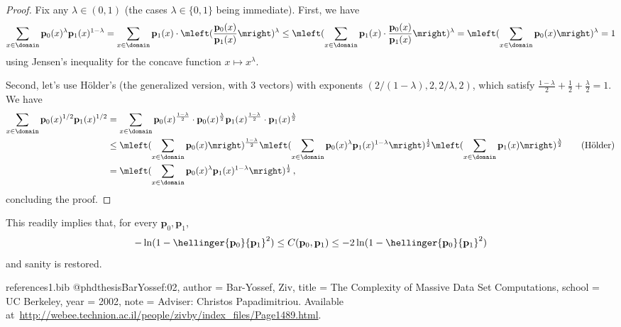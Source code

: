 \documentclass[10pt]{article}
\newcommand{\p}{\mathbf{p}}
\begin{document}
\begin{proof}
Fix any $\lambda \in(0,1)$ (the cases $\lambda\in\{0,1\}$ being immediate). First, we have
\[
\sum_{x\in\domain} \p_0(x)^\lambda\p_1(x)^{1-\lambda}
 = \sum_{x\in\domain} \p_1(x)\cdot \mleft(\frac{\p_0(x)}{\p_1(x)}\mright)^\lambda
 \leq \mleft(\sum_{x\in\domain} \p_1(x)\cdot \frac{\p_0(x)}{\p_1(x)}\mright)^\lambda
 = \mleft(\sum_{x\in\domain} \p_0(x)\mright)^\lambda = 1
\] 
using Jensen's inequality for the concave function $x\mapsto x^\lambda$. 

Second, let's use H\"older's (the generalized version, with 3 vectors) with exponents $(2/(1-\lambda), 2, 2/\lambda, 2)$, which satisfy $\frac{1-\lambda}{2}+\frac{1}{2}+\frac{\lambda}{2}=1$. We have
\begin{align*}
\sum_{x\in\domain} \p_0(x)^{1/2}\p_1(x)^{1/2}
 &= \sum_{x\in\domain} \p_0(x)^{\frac{1-\lambda}{2}}\cdot \p_0(x)^{\frac{\lambda}{2}}\p_1(x)^{\frac{1-\lambda}{2}}\cdot \p_1(x)^{\frac{\lambda}{2}}\\
 &\leq \mleft(\sum_{x\in\domain} \p_0(x)\mright)^{\frac{1-\lambda}{2}}\mleft(\sum_{x\in\domain} \p_0(x)^{\lambda}\p_1(x)^{1-\lambda} \mright)^{\frac{1}{2}}\mleft(\sum_{x\in\domain} \p_1(x)\mright)^{\frac{\lambda}{2}} \tag{H\"older}\\
 &= \mleft(\sum_{x\in\domain} \p_0(x)^{\lambda}\p_1(x)^{1-\lambda} \mright)^{\frac{1}{2}}\,,
\end{align*}
concluding the proof.
\end{proof}
This readily implies that, for every $\p_0,\p_1$,
\begin{equation}
-\ln(1-\hellinger{\p_0}{\p_1}^2) \leq C(\p_0,\p_1) \leq -2\ln(1-\hellinger{\p_0}{\p_1}^2)
\end{equation}
and sanity is restored.


\begin{filecontents}{references1.bib}
@phdthesis{BarYossef:02,
  author = {Bar-Yossef, Ziv},
  title = {The Complexity of Massive Data Set Computations},
  school = {UC Berkeley},
  year = {2002},
  note = {Adviser: Christos Papadimitriou. Available at~\url{http://webee.technion.ac.il/people/zivby/index_files/Page1489.html}.}
}
\end{filecontents}


\end{document}
